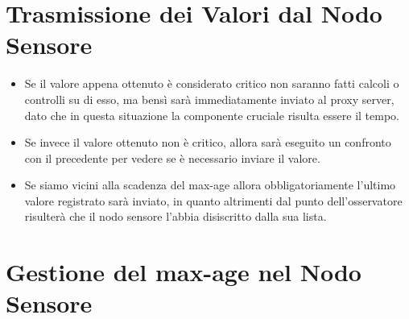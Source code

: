   \section{Trasmissione dei Valori dal Nodo Sensore}

    \begin{itemize}
      \item Se il valore appena ottenuto è considerato critico non saranno fatti calcoli o controlli su di esso, ma bensì sarà immediatamente inviato al proxy server, dato che in questa situazione la componente cruciale risulta essere il tempo.
      \item Se invece il valore ottenuto non è critico, allora sarà eseguito un confronto con il precedente per vedere se è necessario inviare il valore.
      \item Se siamo vicini alla scadenza del max-age allora obbligatoriamente l’ultimo valore registrato sarà inviato, in quanto altrimenti dal punto dell’osservatore risulterà che il nodo sensore l’abbia disiscritto dalla sua lista.
    \end{itemize}

  \section{Gestione del max-age nel Nodo Sensore}\label{Spec:MaxAge}

